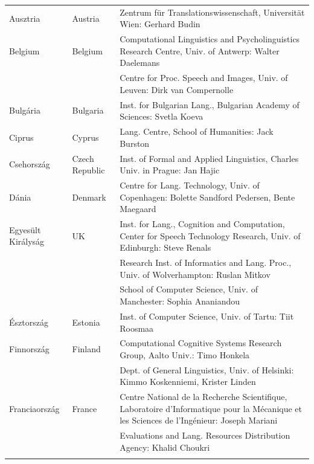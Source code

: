   \small
  \begin{longtable}{llp{105mm}}
    Ausztria & \textcolor{grey1}{Austria} & Zentrum für Translationswissenschaft, Universität Wien: Gerhard Budin\\ \addlinespace
    Belgium & \textcolor{grey1}{Belgium} & Computational Linguistics and Psycholinguistics Research Centre, Univ. of Antwerp: Walter Daelemans\\ \addlinespace
    & & Centre for Proc. Speech and Images, Univ. of Leuven: Dirk van Compernolle \\ \addlinespace
    Bulgária & \textcolor{grey1}{Bulgaria} & Inst. for Bulgarian Lang., Bulgarian Academy of Sciences: Svetla Koeva \\ \addlinespace
    Ciprus & \textcolor{grey1}{Cyprus} & Lang. Centre, School of Humanities: Jack Burston \\ \addlinespace
    Csehország & \textcolor{grey1}{Czech Republic} & Inst. of Formal and Applied Linguistics, Charles Univ. in Prague: Jan Hajic \\ \addlinespace
    Dánia &  \textcolor{grey1}{Denmark} & Centre for Lang. Technology, Univ. of Copenhagen: Bolette Sandford Pedersen, Bente Maegaard\\ \addlinespace
    Egyesült Királyság & \textcolor{grey1}{UK} & Inst. for Lang., Cognition and Computation, Center for Speech Technology Research, Univ. of Edinburgh: Steve Renals \\ \addlinespace 
    & & Research Inst. of Informatics and Lang. Proc., Univ. of Wolverhampton: Ruslan Mitkov \\ \addlinespace 
    & & School of Computer Science, Univ. of Manchester: Sophia Ananiandou \\ \addlinespace 
    Észtország & \textcolor{grey1}{Estonia} & Inst. of Computer Science, Univ. of Tartu: Tiit Roosmaa\\ \addlinespace
    Finnország & \textcolor{grey1}{Finland} & Computational Cognitive Systems Research Group, Aalto Univ.: Timo Honkela\\ \addlinespace
    & & Dept. of General Linguistics, Univ. of Helsinki: Kimmo Koskenniemi, Krister Linden \\ \addlinespace
    Franciaország & \textcolor{grey1}{France} & Centre National de la Recherche Scientifique, Laboratoire d'Informatique pour la Mécanique et les Sciences de l'Ingénieur: Joseph Mariani \\ \addlinespace
    & & Evaluations and Lang. Resources Distribution Agency: Khalid Choukri\\ \addlinespace 

\end{longtable}
